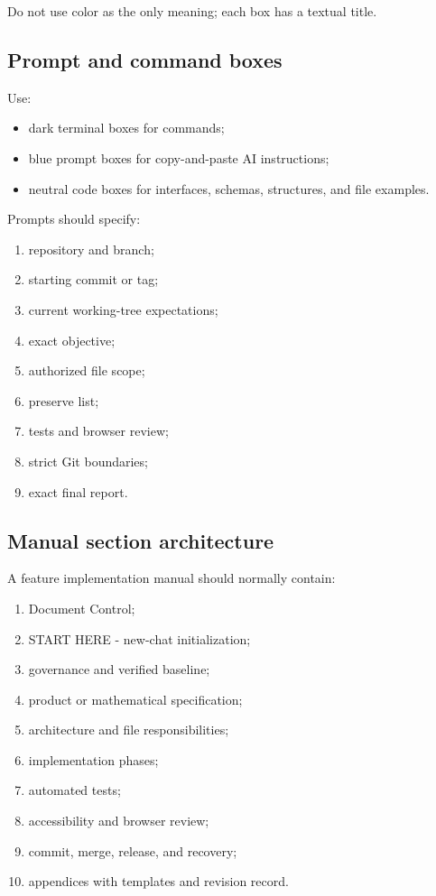 \documentclass[11pt,letterpaper]{article}
\begin{document}
Do not use color as the only meaning; each box has a textual title.

\subsection{Prompt and command boxes}

Use:

\begin{itemize}
    \item dark terminal boxes for commands;
    \item blue prompt boxes for copy-and-paste AI instructions;
    \item neutral code boxes for interfaces, schemas, structures, and file
          examples.
\end{itemize}

Prompts should specify:

\begin{enumerate}
    \item repository and branch;
    \item starting commit or tag;
    \item current working-tree expectations;
    \item exact objective;
    \item authorized file scope;
    \item preserve list;
    \item tests and browser review;
    \item strict Git boundaries;
    \item exact final report.
\end{enumerate}

\subsection{Manual section architecture}

A feature implementation manual should normally contain:

\begin{enumerate}
    \item Document Control;
    \item START HERE - new-chat initialization;
    \item governance and verified baseline;
    \item product or mathematical specification;
    \item architecture and file responsibilities;
    \item implementation phases;
    \item automated tests;
    \item accessibility and browser review;
    \item commit, merge, release, and recovery;
    \item appendices with templates and revision record.
\end{enumerate}
\end{document}
